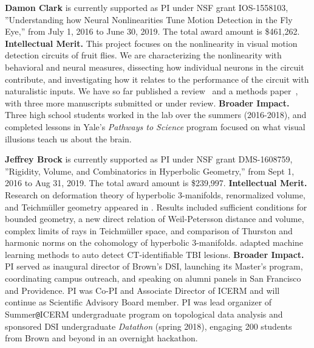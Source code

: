 \vskip10pt \textbf{Damon Clark} is currently supported as PI under NSF
grant IOS-1558103, ''Understanding how Neural Nonlinearities Tune
Motion Detection in the Fly Eye,'' from July 1, 2016 to June 30, 2019.
The total award amount is \$461,262.
{\bf Intellectual Merit.} This project focuses on the nonlinearity
in visual motion detection circuits of fruit flies. We are characterizing
the nonlinearity with behavioral and neural
measures, dissecting how individual neurons in the circuit contribute,
and investigating how it relates to the
performance of the circuit with naturalistic inputs. We have so far
published a review~\citep{clark:16} and a methods
paper~\citep{mano:17}, with three more manuscripts
submitted or under review.
{\bf Broader Impact.} Three high school students worked in the lab
over the summers (2016-2018), and completed lessons in Yale's
\textit{Pathways to Science} program focused on what visual
illusions teach us about the brain.

\vskip10pt \textbf{Jeffrey Brock} is currently supported as PI under NSF
grant DMS-1608759, ''Rigidity, Volume, and Combinatorics in Hyperbolic Geometry,'' from Sept 1, 2016 to Aug 31, 2019. The total award amount is \$239,997.
\textbf{Intellectual Merit.} 
Research on deformation theory of hyperbolic 3-manifolds, renormalized volume, and Teichm\"uller geometry appeared in \citet{BMNS:bounded:models,Brock:Bromberg:vol,Brock:Bromberg:cone:inflex,BLMR:wp:limit,BLMR:teichmuller, Brock:Dunfield:norms}. Results included sufficient conditions for bounded geometry, a new direct relation of Weil-Petersson distance and volume, complex limits of rays in Teichm\"uller space, and comparison of Thurston and harmonic norms on the cohomology of hyperbolic 3-manifolds. \citet{Keshavamurthy:TBI} adapted machine learning methods to auto detect CT-identifiable TBI lesions.
\textbf{Broader Impact.} PI served as inaugural director of Brown's DSI, launching its Master's program, coordinating campus outreach, and speaking on alumni panels in San Francisco and Providence. PI was Co-PI and Associate Director of ICERM and will continue as Scientific Advisory Board member. PI was lead organizer of Summer\verb+@+ICERM undergraduate program on topological data analysis and sponsored DSI undergraduate \textit{Datathon} (spring 2018), engaging 200 students from Brown and beyond in an overnight hackathon. 
